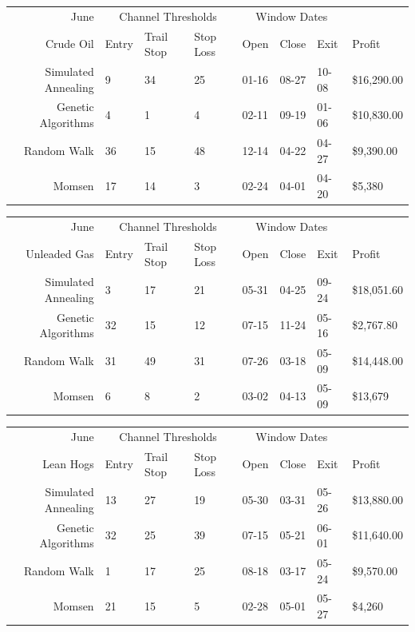 \documentclass[12pt]{article}
\begin{document}
\begin{tabular}{|r|l|l|l|l|l|l|l|}
  \hline
  June & \multicolumn{3}{|c|}{Channel Thresholds} & \multicolumn{3}{|c|}{Window Dates} &  \\
  Crude Oil & Entry & Trail Stop & Stop Loss & Open & Close & Exit & Profit\\ \hline
  Simulated Annealing & 9 & 34 & 25 & 01-16 & 08-27 & 10-08 & \$16,290.00 \\ \hline
  Genetic Algorithms & 4 & 1 & 4 & 02-11 & 09-19 & 01-06 & \$10,830.00 \\ \hline
  Random Walk & 36 & 15 & 48 & 12-14 & 04-22 & 04-27 & \$9,390.00 \\ \hline
  Momsen & 17 & 14 & 3 & 02-24 & 04-01 & 04-20 & \$5,380 \\ \hline
\end{tabular}

\begin{tabular}{|r|l|l|l|l|l|l|l|}
  \hline
  June & \multicolumn{3}{|c|}{Channel Thresholds} & \multicolumn{3}{|c|}{Window Dates} &  \\
  Unleaded Gas & Entry & Trail Stop & Stop Loss & Open & Close & Exit & Profit\\ \hline
  Simulated Annealing & 3 & 17 & 21 & 05-31 & 04-25 & 09-24 & \$18,051.60 \\ \hline
  Genetic Algorithms & 32 & 15 & 12 & 07-15 & 11-24 & 05-16 & \$2,767.80 \\ \hline
  Random Walk & 31 & 49 & 31 & 07-26 & 03-18 & 05-09 & \$14,448.00 \\ \hline
  Momsen & 6 & 8 & 2 & 03-02 & 04-13 & 05-09 & \$13,679 \\ \hline
\end{tabular}

\begin{tabular}{|r|l|l|l|l|l|l|l|}
  \hline
  June & \multicolumn{3}{|c|}{Channel Thresholds} & \multicolumn{3}{|c|}{Window Dates} &  \\
  Lean Hogs & Entry & Trail Stop & Stop Loss & Open & Close & Exit & Profit\\ \hline
  Simulated Annealing & 13 & 27 & 19 & 05-30 & 03-31 & 05-26 & \$13,880.00 \\ \hline
  Genetic Algorithms & 32 & 25 & 39 & 07-15 & 05-21 & 06-01 & \$11,640.00 \\ \hline
  Random Walk & 1 & 17 & 25 & 08-18 & 03-17 & 05-24 & \$9,570.00 \\ \hline
  Momsen & 21 & 15 & 5 & 02-28 & 05-01 & 05-27 & \$4,260 \\ \hline
\end{tabular}
\end{document}
